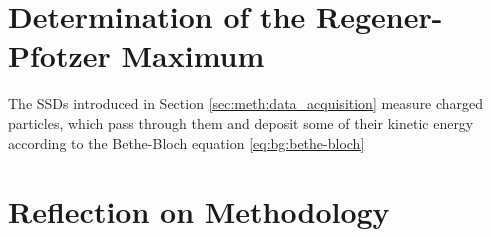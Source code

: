 \section{Determination of the Regener-Pfotzer Maximum \label{sec:meth:regener-pfotzer-determination}}
The \acp{SSD} introduced in Section \ref{sec:meth:data_acquisition} measure charged particles, which pass through them and  deposit some of their kinetic energy according to the Bethe-Bloch equation \ref{eq:bg:bethe-bloch}

\section{Reflection on Methodology \label{sec:meth:reflection_methodology}}